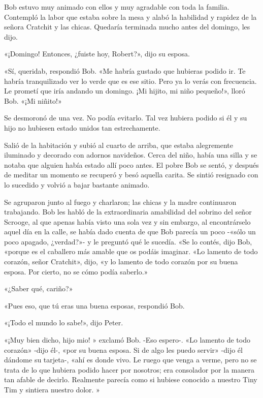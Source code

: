\documentclass{novela}
\begin{document}
 Bob estuvo muy animado con ellos y muy agradable con toda la familia. Contempló la labor que estaba sobre la mesa y alabó la habilidad y rapidez de la señora Cratchit y las chicas. Quedaría terminada mucho antes del domingo, les dijo.

 «¡Domingo! Entonces, ¿fuiste hoy, Robert?», dijo su esposa.

 «Sí, queridab, respondió Bob. «Me habría gustado que hubieras podido ir. Te habría tranquilizado ver lo verde que es ese sitio. Pero ya lo verás con frecuencia. Le prometí que iría andando un domingo. ¡Mi hijito, mi niño pequeño!», lloró Bob. «¡Mi niñito!»

 Se desmoronó de una vez. No podía evitarlo. Tal vez hubiera podido si él y su hijo no hubiesen estado unidos tan estrechamente.

 Salió de la habitación y subió al cuarto de arriba, que estaba alegremente iluminado y decorado con adornos navideños. Cerca del niño, había una silla y se notaba que alguien había estado allí poco antes. El pobre Bob se sentó, y después de meditar un momento se recuperó y besó aquella carita. Se sintió resignado con lo sucedido y volvió a bajar bastante animado.

 Se agruparon junto al fuego y charlaron; las chicas y la madre continuaron trabajando. Bob les habló de la extraordinaria amabilidad del sobrino del señor Scrooge, al que apenas había visto una sola vez y sin embargo, al encontrárselo aquel día en la calle, se había dado cuenta de que Bob parecía un poco -«sólo un poco apagado, ¿verdad?»- y le preguntó qué le sucedía. «Se lo contés, dijo Bob, «porque es el caballero más amable que os podáis imaginar. «Lo lamento de todo corazón, señor Cratchit», dijo, «y lo lamento de todo corazón por su buena esposa. Por cierto, no se cómo podía saberlo.»

 «¿Saber qué, cariño?»

 «Pues eso, que tú eras una buena esposas, respondió Bob.

 «¡Todo el mundo lo sabe!», dijo Peter.

 «¡Muy bien dicho, hijo mio! » exclamó Bob. -Eso espero-. «Lo lamento de todo corazón» -dijo él-, «por su buena esposa. Si de algo les puedo servir» -dijo él dándome su tarjeta-, «ahí es donde vivo. Le ruego que venga a verme, pero no se trata de lo que hubiera podido hacer por nosotros; era consolador por la manera tan afable de decirlo. Realmente parecía como si hubiese conocido a nuestro Tiny Tim y sintiera nuestro dolor. »
\end{document}
